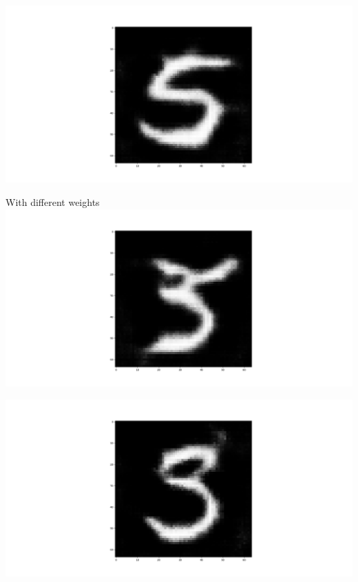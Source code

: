 \documentclass{beamer}
\begin{document}
\begin{frame}
    \centering
    \includegraphics[scale=0.2]{images/gen5.png}
\end{frame}

\begin{frame}{With different weights}
    \centering
    \includegraphics[scale=0.2]{images/gen35.png}
\end{frame}

\begin{frame}
    \centering
    \includegraphics[scale=0.2]{images/gen35with3weighted.png}
\end{frame}
\end{document}
